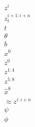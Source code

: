 \documentclass{article}
\begin{document}
    \begin{align}
        z^i \\
        z^{i+1:i+n}_t \\
        t \\
        \theta \\
        b \\
        x^0 \\
        z^0 \\
        z^{1:4} \\
        z^{5:8} \\
        \hat{x}^8 \\
        \approx z^{i:i+n} \\
        \psi \\
        \phi \\
    \end{align}
\end{document}
